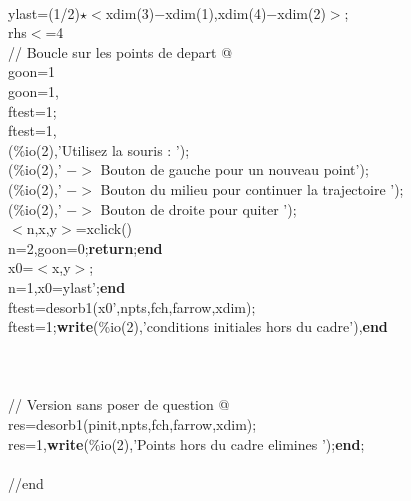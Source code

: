 {\begin{flushleft}
{\\ 
\cmarg ylast=(1/2)$\star$$<$xdim(3)$-$xdim(1),xdim(4)$-$xdim(2)$>$;\\ 
 rhs$<$=4\\ 
\cmarg \verb@// Boucle sur les points de depart @\\ 
\cmarg \hspace{0.5cm}goon=1\\ 
\cmarg \hspace{0.5cm}{\bf while} goon=1,\\ 
\cmarg \hspace{1.8cm}ftest=1;\\ 
\cmarg \hspace{1.8cm}{\bf while} ftest=1,\\ 
\cmarg \hspace{2.5cm}{\bf write}(\%io(2),'Utilisez la souris : ');\\ 
\cmarg \hspace{2.5cm}{\bf write}(\%io(2),' $-$$>$ Bouton de gauche pour un nouveau point');\\ 
\cmarg \hspace{2.5cm}{\bf write}(\%io(2),' $-$$>$ Bouton du milieu pour continuer la trajectoire ');\\ 
\cmarg \hspace{2.5cm}{\bf write}(\%io(2),' $-$$>$ Bouton de droite pour quiter ');\\ 
\cmarg \hspace{2.5cm}$<$n,x,y$>$=xclick()\\ 
\cmarg \hspace{2.5cm}{\bf if} n=2,goon=0;{\bf return};{\bf end}\\ 
\cmarg \hspace{2.5cm}x0=$<$x,y$>$;\\ 
\cmarg \hspace{2.5cm}{\bf if} n=1,x0=ylast';{\bf end} \\ 
\cmarg \hspace{2.5cm}ftest=desorb1(x0',npts,fch,farrow,xdim);\\ 
\cmarg \hspace{2.5cm}{\bf if} ftest=1;{\bf write}(\%io(2),'conditions initiales hors du cadre'),{\bf end}\\ 
\cmarg \hspace{1.8cm}{\bf end}\\ 
\cmarg \hspace{0.5cm}{\bf end}\\ 
\\ 
\cmarg \verb@// Version sans poser de question @\\ 
\cmarg res=desorb1(pinit,npts,fch,farrow,xdim);\\ 
 res=1,{\bf write}(\%io(2),'Points hors du cadre elimines ');{\bf end};\\ 
\\ 
\cmarg //end}
\end{flushleft}}




